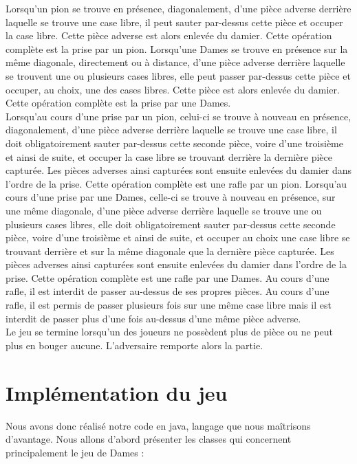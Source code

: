 \documentclass[12,french]{report}
\begin{document}
Lorsqu’un pion se trouve en présence, diagonalement, d’une pièce adverse derrière laquelle se trouve une case libre, il peut sauter par-dessus cette pièce et occuper la case libre. Cette pièce adverse est alors enlevée du damier. Cette opération complète est la prise par un pion. Lorsqu’une Dames se trouve en présence sur la même diagonale, directement ou à distance, d’une pièce adverse derrière laquelle se trouvent une ou plusieurs cases libres, elle peut passer par-dessus cette pièce et occuper, au choix, une des cases libres. Cette pièce est alors enlevée du damier. Cette opération complète est la prise par une Dames.\\

Lorsqu’au cours d’une prise par un pion, celui-ci se trouve à nouveau en présence, diagonalement, d’une pièce adverse derrière laquelle se trouve une case libre, il doit obligatoirement sauter par-dessus cette seconde pièce, voire d’une troisième et ainsi de suite, et occuper la case libre se trouvant derrière la dernière pièce capturée. Les pièces adverses ainsi capturées sont ensuite enlevées du damier dans l’ordre de la prise. Cette opération complète est une rafle par un pion. Lorsqu’au cours d’une prise par une Dames, celle-ci se trouve à nouveau en présence, sur une même diagonale, d’une pièce adverse derrière laquelle se trouve une ou plusieurs cases libres, elle doit obligatoirement sauter par-dessus cette seconde pièce, voire d’une troisième et ainsi de suite, et occuper au choix une case libre se trouvant derrière et sur la même diagonale que la dernière pièce capturée. Les pièces adverses ainsi capturées sont ensuite enlevées du damier dans l’ordre de la prise. Cette opération complète est une rafle par une Dames. Au cours d’une rafle, il est interdit de passer au-dessus de ses propres pièces. Au cours d’une rafle, il est permis de passer plusieurs fois sur une même case libre mais il est interdit de passer plus d’une fois au-dessus d’une même pièce adverse.\\

Le jeu se termine lorsqu'un des joueurs ne possèdent plus de pièce ou ne peut plus en bouger aucune. L'adversaire remporte alors la partie.

\section{Implémentation du jeu}

Nous avons donc réalisé notre code en java, langage que nous maîtrisons d'avantage. Nous allons d'abord présenter les classes qui concernent principalement le jeu de Dames :
\end{document}
